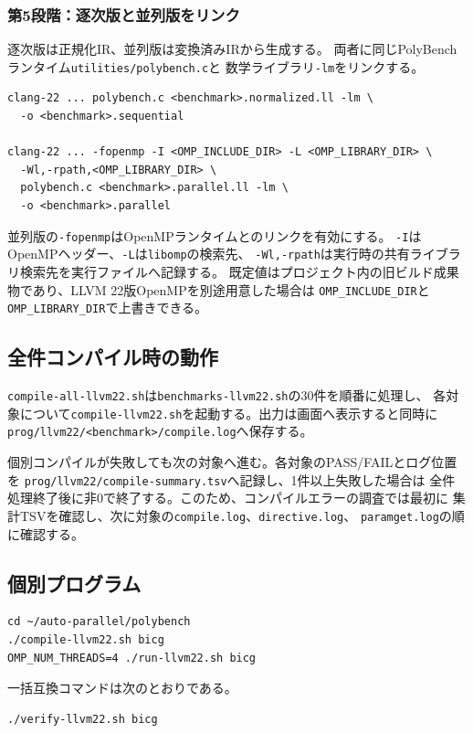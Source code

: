 \documentclass[a4paper,11pt]{ltjsarticle}
\begin{document}
\subsubsection{第5段階：逐次版と並列版をリンク}
逐次版は正規化IR、並列版は変換済みIRから生成する。
両者に同じPolyBenchランタイム\texttt{utilities/polybench.c}と
数学ライブラリ\texttt{-lm}をリンクする。
\begin{lstlisting}
clang-22 ... polybench.c <benchmark>.normalized.ll -lm \
  -o <benchmark>.sequential

clang-22 ... -fopenmp -I <OMP_INCLUDE_DIR> -L <OMP_LIBRARY_DIR> \
  -Wl,-rpath,<OMP_LIBRARY_DIR> \
  polybench.c <benchmark>.parallel.ll -lm \
  -o <benchmark>.parallel
\end{lstlisting}

並列版の\texttt{-fopenmp}はOpenMPランタイムとのリンクを有効にする。
\texttt{-I}はOpenMPヘッダー、\texttt{-L}は\texttt{libomp}の検索先、
\texttt{-Wl,-rpath}は実行時の共有ライブラリ検索先を実行ファイルへ記録する。
既定値はプロジェクト内の旧ビルド成果物であり、LLVM 22版OpenMPを別途用意した場合は
\texttt{OMP\_INCLUDE\_DIR}と\texttt{OMP\_LIBRARY\_DIR}で上書きできる。

\subsection{全件コンパイル時の動作}
\texttt{compile-all-llvm22.sh}は\texttt{benchmarks-llvm22.sh}の30件を順番に処理し、
各対象について\texttt{compile-llvm22.sh}を起動する。出力は画面へ表示すると同時に
\texttt{prog/llvm22/<benchmark>/compile.log}へ保存する。

個別コンパイルが失敗しても次の対象へ進む。各対象のPASS/FAILとログ位置を
\texttt{prog/llvm22/compile-summary.tsv}へ記録し、1件以上失敗した場合は
全件処理終了後に非0で終了する。このため、コンパイルエラーの調査では最初に
集計TSVを確認し、次に対象の\texttt{compile.log}、\texttt{directive.log}、
\texttt{paramget.log}の順に確認する。

\subsection{個別プログラム}
\begin{lstlisting}
cd ~/auto-parallel/polybench
./compile-llvm22.sh bicg
OMP_NUM_THREADS=4 ./run-llvm22.sh bicg
\end{lstlisting}

一括互換コマンドは次のとおりである。
\begin{lstlisting}
./verify-llvm22.sh bicg
\end{lstlisting}
\end{document}
